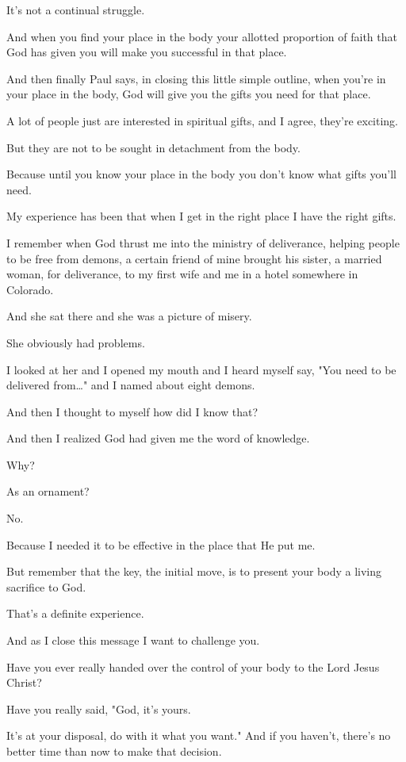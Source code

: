 \documentclass[11pt]{article}
\begin{document}
It's not a continual struggle.

And when you find your place in the body your
allotted proportion of faith that God has
given you will make you successful in that
place.

And then finally Paul says, in closing this
little simple outline, when you're in your
place in the body, God will give you the gifts
you need for that place.

A lot of people just are interested in
spiritual gifts, and I agree, they're
exciting.

But they are not to be sought in detachment
from the body.

Because until you know your place in the body
you don't know what gifts you'll need.

My experience has been that when I get in the
right place I have the right gifts.

I remember when God thrust me into the
ministry of deliverance, helping people to be
free from demons, a certain friend of mine
brought his sister, a married woman, for
deliverance, to my first wife and me in a
hotel somewhere in Colorado.

And she sat there and she was a picture of
misery.

She obviously had problems.

I looked at her and I opened my mouth and I
heard myself say, "You need to be delivered
from\ldots{}" and I named about eight demons.

And then I thought to myself how did I know
that?

And then I realized God had given me the word
of knowledge.

Why?

As an ornament?

No.

Because I needed it to be effective in the
place that He put me.

But remember that the key, the initial move,
is to present your body a living sacrifice to
God.

That's a definite experience.

And as I close this message I want to
challenge you.

Have you ever really handed over the control
of your body to the Lord Jesus Christ?

Have you really said, "God, it's yours.

It's at your disposal, do with it what you
want." And if you haven't, there's no better
time than now to make that decision.
\end{document}
